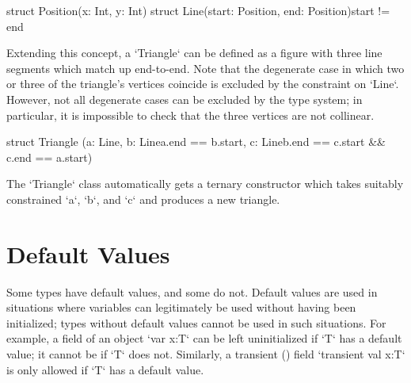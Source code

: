 \begin{xten}
struct Position(x: Int, y: Int) {}
struct Line(start: Position, end: Position){start != end}
  {}
\end{xten}


Extending this concept, a \xcd`Triangle` can be defined as a figure with three
line segments which match up end-to-end.  Note that the degenerate case in
which two or three of the triangle's vertices coincide is excluded by the
constraint on \xcd`Line`.  However, not all degenerate cases can be excluded
by the type system; in particular, it is impossible to check that the three
vertices are not collinear. 

% 
\begin{xten}
struct Triangle 
 (a: Line, 
  b: Line{a.end == b.start}, 
  c: Line{b.end == c.start && c.end == a.start})  
 {}
\end{xten}
%

The \xcd`Triangle` class automatically gets a ternary constructor which takes
suitably constrained \xcd`a`, \xcd`b`, and \xcd`c` and produces a new
triangle. 

\section{Default Values}
\label{DefaultValues}

Some types have default values, and some do not. Default values are used in
situations where variables can legitimately be used without having been
initialized; types without default values cannot be used in such situations.
For example, a field of an object \xcd`var x:T` can be left uninitialized if
\xcd`T` has a default value; it cannot be if \xcd`T` does not. Similarly, a
transient () field \xcd`transient val x:T` is only
allowed if \xcd`T` has a default value.


